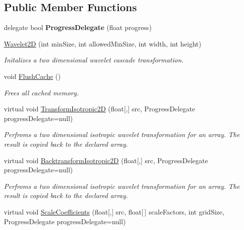 \subsection*{\-Public \-Member \-Functions}
\begin{DoxyCompactItemize}
\item 
\hypertarget{class_turbo_wavelets_1_1_wavelet2_d_aec52fe74aa08e073119064ef4ac3fe93}{delegate bool {\bfseries \-Progress\-Delegate} (float progress)}\label{class_turbo_wavelets_1_1_wavelet2_d_aec52fe74aa08e073119064ef4ac3fe93}

\item 
\hyperlink{class_turbo_wavelets_1_1_wavelet2_d_a5156da3a3376121d64967dd8cd75725b}{\-Wavelet2\-D} (int min\-Size, int allowed\-Min\-Size, int width, int height)
\begin{DoxyCompactList}\small\item\em \-Initalizes a two dimensional wavelet cascade transformation. \end{DoxyCompactList}\item 
void \hyperlink{class_turbo_wavelets_1_1_wavelet2_d_a727e557f207cf861b10c38f1f1a91b52}{\-Flush\-Cache} ()
\begin{DoxyCompactList}\small\item\em \-Frees all cached memory. \end{DoxyCompactList}\item 
virtual void \hyperlink{class_turbo_wavelets_1_1_wavelet2_d_ac647a989c2b66ca08a8b7e4196cbc547}{\-Transform\-Isotropic2\-D} (float\mbox{[},\mbox{]} src, \-Progress\-Delegate progress\-Delegate=null)
\begin{DoxyCompactList}\small\item\em \-Perfroms a two dimensional isotropic wavelet transformation for an array. \-The result is copied back to the declared array. \end{DoxyCompactList}\item 
virtual void \hyperlink{class_turbo_wavelets_1_1_wavelet2_d_ac1644fb0d5f8a2ba8f265b445cba454b}{\-Backtransform\-Isotropic2\-D} (float\mbox{[},\mbox{]} src, \-Progress\-Delegate progress\-Delegate=null)
\begin{DoxyCompactList}\small\item\em \-Perfroms a two dimensional isotropic wavelet transformation for an array. \-The result is copied back to the declared array. \end{DoxyCompactList}\item 
virtual void \hyperlink{class_turbo_wavelets_1_1_wavelet2_d_a55e3f96cb79da6cc4621ccc1118a0d6f}{\-Scale\-Coefficients} (float\mbox{[},\mbox{]} src, float\mbox{[}$\,$\mbox{]} scale\-Factors, int grid\-Size, \-Progress\-Delegate progress\-Delegate=null)

\end{DoxyCompactItemize}
